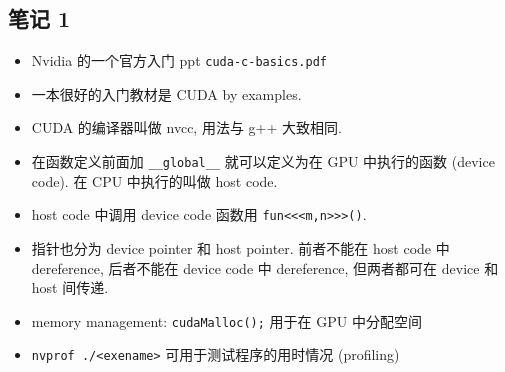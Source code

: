 

\subsection{笔记 1}
\begin{itemize}
\item Nvidia 的一个官方入门 ppt \verb|cuda-c-basics.pdf|
\item 一本很好的入门教材是 CUDA by examples.
\item CUDA 的编译器叫做 nvcc, 用法与 g++ 大致相同.
\item 在函数定义前面加 \verb`__global__` 就可以定义为在 GPU 中执行的函数 (device code). 在 CPU 中执行的叫做 host code.
\item host code 中调用 device code 函数用 \verb`fun<<<m,n>>>()`.
\item 指针也分为 device pointer 和 host pointer. 前者不能在 host code 中 dereference, 后者不能在 device code 中 dereference, 但两者都可在 device 和 host 间传递.
\item memory management:
\verb`cudaMalloc();` 用于在 GPU 中分配空间
\item \verb`nvprof ./<exename>` 可用于测试程序的用时情况 (profiling)
\end{itemize}

